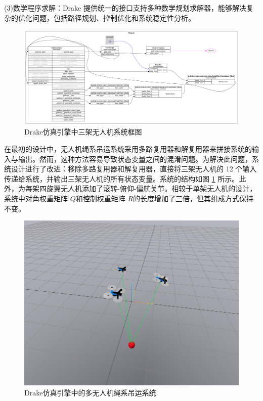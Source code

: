 \documentclass[lang=chs, degree=master, blindreview=false, winfonts=true]{yanputhesis}
\begin{document}
(3)数学程序求解：Drake 提供统一的接口支持多种数学规划求解器，能够解决复杂的优化问题，包括路径规划、控制优化和系统稳定性分析。

\begin{figure}[hbt!]
	\centering
	\includegraphics[width=38pc]{picture/drake.png} 
	\caption{Drake仿真引擎中三架无人机系统框图} 
	\label{drake}
\end{figure}
在最初的设计中，无人机绳系吊运系统采用多路复用器和解复用器来拼接系统的输入与输出。然而，这种方法容易导致状态变量之间的混淆问题。为解决此问题，系统设计进行了改进：移除多路复用器和解复用器，直接将三架无人机的 12 个输入传递给系统，并输出三架无人机的所有状态变量。系统的结构如图 \ref{drake} 所示。此外，为每架四旋翼无人机添加了滚转-俯仰-偏航关节。相较于单架无人机的设计，系统中对角权重矩阵 $Q$和控制权重矩阵 $R$的长度增加了三倍，但其组成方式保持不变。

\begin{figure}[hbt!]
	\centering
	\includegraphics[width=36pc]{picture/5_1.png} 
	\caption{Drake仿真引擎中的多无人机绳系吊运系统} 
	\label{5_1}
\end{figure}
\end{document}
